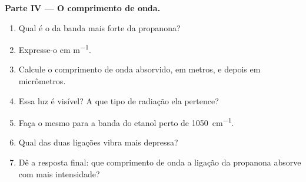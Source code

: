 \begin{problem}
\medskip
\noindent\textbf{Parte IV --- O comprimento de onda.}
\begin{enumerate}[resume]
  \item Qual é o  da banda mais forte da propanona?
  \item Expresse-o em \si{m^{-1}}.
  \item Calcule o comprimento de onda absorvido, em metros, e depois em
        micrômetros.
  \item Essa luz é visível? A que tipo de radiação ela pertence?
  \item Faça o mesmo para a banda  do etanol perto de
        \qty{1050}{cm^{-1}}.
  \item Qual das duas ligações vibra mais depressa?
  \item Dê a resposta final: que comprimento de onda a ligação 
        da propanona absorve com mais intensidade?
\end{enumerate}
\end{problem}
